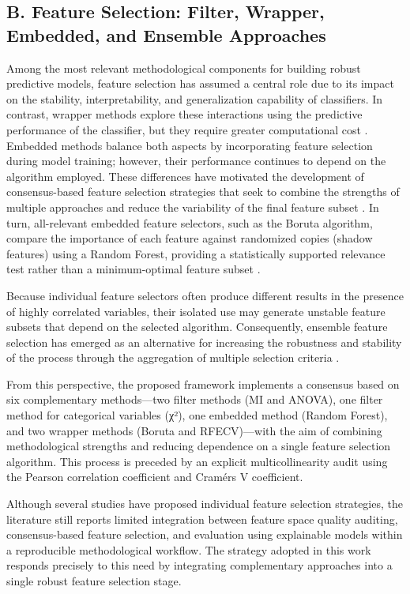 \documentclass[
  number]{elsarticle}
\begin{document}
\subsection{B. Feature Selection: Filter, Wrapper, Embedded, and
Ensemble
Approaches}\label{b.-feature-selection-filter-wrapper-embedded-and-ensemble-approaches}

Among the most relevant methodological components for building robust
predictive models, feature selection has assumed a central role due to
its impact on the stability, interpretability, and generalization
capability of classifiers. In contrast, wrapper methods explore these
interactions using the predictive performance of the classifier, but
they require greater computational cost \citep{zhou_efficient_2024}.
Embedded methods balance both aspects by incorporating feature selection
during model training; however, their performance continues to depend on
the algorithm employed. These differences have motivated the development
of consensus-based feature selection strategies that seek to combine the
strengths of multiple approaches and reduce the variability of the final
feature subset \citep{moslemi_tutorial-based_2023}. In turn,
all-relevant embedded feature selectors, such as the Boruta algorithm,
compare the importance of each feature against randomized copies (shadow
features) using a Random Forest, providing a statistically supported
relevance test rather than a minimum-optimal feature subset
\citep{kursa_feature_2010}.

Because individual feature selectors often produce different results in
the presence of highly correlated variables, their isolated use may
generate unstable feature subsets that depend on the selected algorithm.
Consequently, ensemble feature selection has emerged as an alternative
for increasing the robustness and stability of the process through the
aggregation of multiple selection criteria \citep{zhou_efficient_2024}.

From this perspective, the proposed framework implements a consensus
based on six complementary methods---two filter methods (MI and ANOVA),
one filter method for categorical variables (χ²), one embedded method
(Random Forest), and two wrapper methods (Boruta and RFECV)---with the
aim of combining methodological strengths and reducing dependence on a
single feature selection algorithm. This process is preceded by an
explicit multicollinearity audit using the Pearson correlation
coefficient and Cramér\textquotesingle s V coefficient.

Although several studies have proposed individual feature selection
strategies, the literature still reports limited integration between
feature space quality auditing, consensus-based feature selection, and
evaluation using explainable models within a reproducible methodological
workflow. The strategy adopted in this work responds precisely to this
need by integrating complementary approaches into a single robust
feature selection stage.
\end{document}
